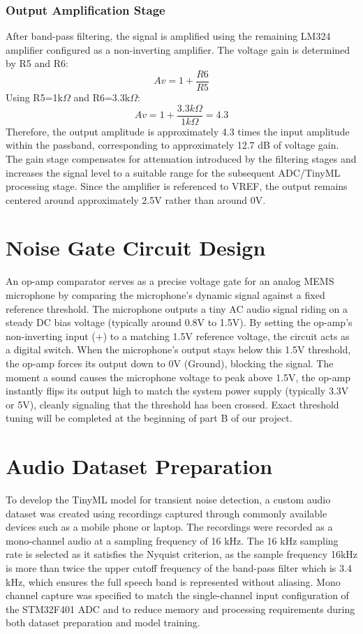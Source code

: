 \subsubsection{Output Amplification Stage}

After band-pass filtering, the signal is amplified using the remaining LM324 amplifier configured as a non-inverting amplifier. The voltage gain is determined by R5 and R6:
\[ Av = 1 + \frac{R6}{R5} \]
Using R5=1k$\Omega$ and R6=3.3k$\Omega$:
\[ Av = 1 + \frac{3.3k\Omega}{1k\Omega}  = 4.3 \]
Therefore, the output amplitude is approximately 4.3 times the input amplitude within the passband, corresponding to approximately 12.7 dB of voltage gain.
The gain stage compensates for attenuation introduced by the filtering stages and increases the signal level to a suitable range for the subsequent ADC/TinyML processing stage. Since the amplifier is referenced to VREF, the output remains centered around approximately 2.5V rather than around 0V.

\section{Noise Gate Circuit Design}

An op-amp comparator serves as a precise voltage gate for an analog MEMS microphone by comparing the microphone's dynamic signal against a fixed reference threshold. The microphone outputs a tiny AC audio signal riding on a steady DC bias voltage (typically around 0.8V to 1.5V). By setting the op-amp's non-inverting input (+) to a matching 1.5V reference voltage, the circuit acts as a digital switch. When the microphone's output stays below this 1.5V threshold, the op-amp forces its output down to 0V (Ground), blocking the signal. The moment a sound causes the microphone voltage to peak above 1.5V, the op-amp instantly flips its output high to match the system power supply (typically 3.3V or 5V), cleanly signaling that the threshold has been crossed. Exact threshold tuning will be completed at the beginning of part B of our project.

\section{Audio Dataset Preparation}

To develop the TinyML model for transient noise detection, a custom audio dataset was created using recordings captured through commonly available devices such as a mobile phone or laptop. The recordings were recorded as a mono-channel audio at a sampling frequency of 16 kHz. The 16 kHz sampling rate is selected as it satisfies the Nyquist criterion, as the sample frequency 16kHz is more than twice the upper cutoff frequency of the band-pass filter which is 3.4 kHz, which ensures the full speech band is represented without aliasing. Mono channel capture was specified to match the single-channel input configuration of the STM32F401 ADC and to reduce memory and processing requirements during both dataset preparation and model training.

